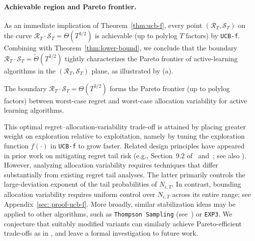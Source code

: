 \documentclass[nonblindrev]{informs3_noinforms}
\begin{document}
{\paragraph{Achievable region and Pareto frontier.} 
As an immediate implication of Theorem~\ref{thm:ucb-f}, every point $(\mathcal{R}_T,\mathcal{S}_T)$ on the curve $\mathcal{R}_T\cdot \mathcal{S}_T={\Theta}(T^{3/2})$ is achievable (up to polylog $T$ factors) by \texttt{UCB-f}. Combining with Theorem~\ref{thm:lower-bound}, we conclude that the boundary $\mathcal{R}_T\cdot \mathcal{S}_T=\tilde{\Theta}(T^{3/2})$ tightly characterizes the Pareto frontier of active-learning algorithms in the $(\mathcal{R}_T,\mathcal{S}_T)$ plane, as illustrated by  (a). 
\begin{corollary}\label{cor:pareto}
 The boundary $\mathcal{R}_T\cdot\mathcal{S}_T=\Theta(T^{3/2})$ forms the Pareto frontier (up to polylog factors) between worst-case regret and worst-case allocation variability for active learning algorithms.
\end{corollary}
This optimal regret--allocation-variability trade-off is attained by placing greater weight on exploration relative to exploitation, namely by tuning the exploration function $f(\cdot)$ in \texttt{UCB-f} to grow faster. Related design principles have appeared in prior work on mitigating regret tail risk (e.g., Section~9.2 of~\cite{lattimore2020bandit} and~\cite{fan2021fragility, simchi2023regret}; see also ). However, analyzing allocation variability requires techniques that differ substantially from existing regret tail analyses. The latter primarily controls the large-deviation exponent of the tail probabilities of $N_{i,T}$. In contrast, bounding allocation variability requires uniform control over $N_{i,T}$ across its entire range; see Appendix~\ref{sec: proof-ucb-f}. More broadly, similar stabilization ideas may be applied to other algorithms, such as \texttt{Thompson Sampling} (see~\cite{halder2025stable}) or \texttt{EXP3}. We conjecture that suitably modified variants can similarly achieve Pareto-efficient trade-offs as in , and leave a formal investigation to future work.

}
\end{document}
